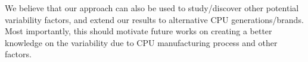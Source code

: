 We believe that our approach can also be used to study/discover other potential variability factors, and extend our results to alternative CPU generations/brands.
Most importantly, this should motivate future works on creating a better knowledge on the variability due to CPU manufacturing process and other factors.

